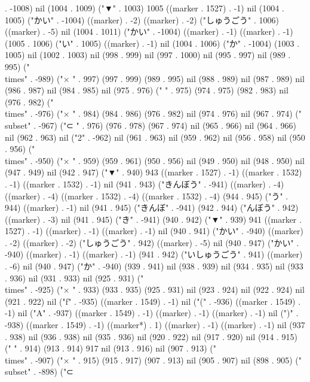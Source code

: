 . -1008) nil (1004 . 1009) ("▼" . 1003) 1005 ((marker . 1527) . -1) nil (1004 . 1005) ("かい" . -1004) ((marker) . -2) ((marker) . -2) ("しゅうごう" . 1006) ((marker) . -5) nil (1004 . 1011) ("かい" . -1004) ((marker) . -1) ((marker) . -1) (1005 . 1006) ("い" . 1005) ((marker) . -1) nil (1004 . 1006) ("か" . -1004) (1003 . 1005) nil (1002 . 1003) nil (998 . 999) nil (997 . 1000) nil (995 . 997) nil (989 . 995) ("\\times" . -989) ("×
" . 997) (997 . 999) (989 . 995) nil (988 . 989) nil (987 . 989) nil (986 . 987) nil (984 . 985) nil (975 . 976) (" " . 975) (974 . 975) (982 . 983) nil (976 . 982) ("\\times" . -976) ("×
" . 984) (984 . 986) (976 . 982) nil (974 . 976) nil (967 . 974) ("\\subset" . -967) ("⊂
" . 976) (976 . 978) (967 . 974) nil (965 . 966) nil (964 . 966) nil (962 . 963) nil ("2" . -962) nil (961 . 963) nil (959 . 962) nil (956 . 958) nil (950 . 956) ("\\times" . -950) ("×
" . 959) (959 . 961) (950 . 956) nil (949 . 950) nil (948 . 950) nil (947 . 949) nil (942 . 947) ("▼" . 940) 943 ((marker . 1527) . -1) ((marker . 1532) . -1) ((marker . 1532) . -1) nil (941 . 943) ("きんぼう" . -941) ((marker) . -4) ((marker) . -4) ((marker . 1532) . -4) ((marker . 1532) . -4) (944 . 945) ("う" . 944) ((marker) . -1) nil (941 . 945) ("きんぼ" . -941) (942 . 944) ("んぼう" . 942) ((marker) . -3) nil (941 . 945) ("き" . -941) (940 . 942) ("▼" . 939) 941 ((marker . 1527) . -1) ((marker) . -1) ((marker) . -1) nil (940 . 941) ("かい" . -940) ((marker) . -2) ((marker) . -2) ("しゅうごう" . 942) ((marker) . -5) nil (940 . 947) ("かい" . -940) ((marker) . -1) ((marker) . -1) (941 . 942) ("いしゅうごう" . 941) ((marker) . -6) nil (940 . 947) ("か" . -940) (939 . 941) nil (938 . 939) nil (934 . 935) nil (933 . 936) nil (931 . 933) nil (925 . 931) ("\\times" . -925) ("×
" . 933) (933 . 935) (925 . 931) nil (923 . 924) nil (922 . 924) nil (921 . 922) nil ("f" . -935) ((marker . 1549) . -1) nil ("(" . -936) ((marker . 1549) . -1) nil ("A" . -937) ((marker . 1549) . -1) ((marker) . -1) ((marker) . -1) nil (")" . -938) ((marker . 1549) . -1) ((marker*) . 1) ((marker) . -1) ((marker) . -1) nil (937 . 938) nil (936 . 938) nil (935 . 936) nil (920 . 922) nil (917 . 920) nil (914 . 915) ("  " . 914) (913 . 914) 917 nil (913 . 916) nil (907 . 913) ("\\times" . -907) ("×
" . 915) (915 . 917) (907 . 913) nil (905 . 907) nil (898 . 905) ("\\subset" . -898) ("⊂

